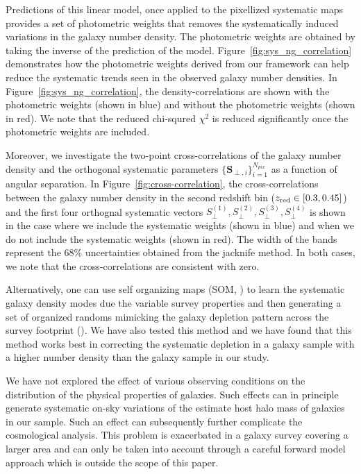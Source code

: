 \documentclass[fleqn,usenatbib,useAMS]{mnras}
\begin{document}
Predictions of this linear model, once applied to the pixellized systematic maps provides a set of photometric weights that removes the systematically induced variations in the galaxy number density. The photometric weights are obtained by taking the inverse of the prediction of the model. Figure~\ref{fig:sys_ng_correlation} demonstrates how the photometric weights derived from our framework can help reduce the systematic trends seen in the observed galaxy number densities. In Figure~\ref{fig:sys_ng_correlation}, the density-correlations are shown with the photometric weights (shown in blue) and without the photometric weights (shown in red). We note that the reduced chi-squred $\chi^{2}$ is reduced significantly once the photometric weights are included. 

Moreover, we investigate the two-point cross-correlations of the galaxy number density and the orthogonal systematic parameters $\{\mathbf{S}_{\perp, i}\}_{i=1}^{N_{pix}}$ as a function of angular separation. In Figure~\ref{fig:cross-correlation}, the cross-correlations between the galaxy number density in the second redshift bin ($z_{\rm red} \in [0.3, 0.45]$) and the first four orthognal systematic vectors $S_{\perp}^{(1)}, S_{\perp}^{(2)}, S_{\perp}^{(3)}, S_{\perp}^{(4)}$ is shown in the case where we include the systematic weights (shown in blue) and when we do not include the systematic weights (shown in red). The width of the bands represent the 68\% uncertainties obtained from the jacknife method. In both cases, we note that the cross-correlations are consistent with zero. 

Alternatively, one can use self organizing maps (SOM, \citealt{kohonen1997}) to learn the systematic galaxy density modes due the variable survey properties and then generating a set of organized randoms mimicking the galaxy depletion pattern across the survey footprint (\citealt{som2020}). We have also tested this method and we have found that this method works best in correcting the systematic depletion in a galaxy sample with a higher number density than the galaxy sample in our study. 

We have not explored the effect of various observing conditions on the distribution of the physical properties of galaxies. Such effects can in principle generate systematic on-sky variations of the estimate host halo mass of galaxies in our sample. Such an effect can subsequently further complicate the cosmological analysis. This problem is exacerbated in a galaxy survey covering a larger area and can only be taken into account through a careful forward model approach which is outside the scope of this paper.  
\end{document}
